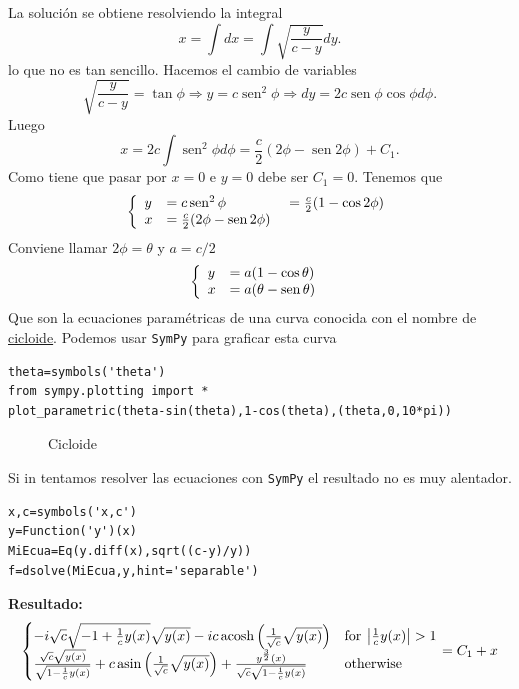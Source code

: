 \documentclass{article}
\DeclareMathOperator{\sen}{sen}
\begin{document}
La solución se obtiene resolviendo la integral
\[x=\int dx=\int \sqrt{\frac{y}{c-y}}dy.\]
lo que no es tan sencillo. Hacemos el cambio de variables
\[\sqrt{\frac{y}{c-y}}=\tan\phi\Longrightarrow y=c\sen^2\phi\Longrightarrow dy=2c\sen\phi\cos\phi d\phi.\]
Luego
\[x=2c\int\sen^2\phi d\phi=\frac{c}{2}\left(2\phi-\sen 2\phi\right)+C_1.\]
Como tiene que pasar por $x=0$ e $y=0$ debe ser $C_1=0$.  Tenemos que
 \[\left\{\begin{array}{l l l}
	      y&=c\sen^2 \phi&=\frac{c}{2}(1-\cos2\phi)\\
	      x&=\frac{c}{2}(2\phi-\sen2\phi)\ &\\
          \end{array}\right.
\]
Conviene llamar $2\phi=\theta$ y $a=c/2$
 \[\left\{\begin{array}{l l }
	      y&= a(1-\cos\theta)\\
	      x&=a(\theta-\sen\theta)\
          \end{array}\right.
\]
Que son la ecuaciones paramétricas de una curva conocida con el nombre de \href{http://es.wikipedia.org/wiki/Cicloide}{cicloide}. Podemos usar \texttt{SymPy} para graficar esta curva
\begin{lstlisting}
theta=symbols('theta')
from sympy.plotting import *
plot_parametric(theta-sin(theta),1-cos(theta),(theta,0,10*pi))
\end{lstlisting}



\begin{figure}[h]
\begin{center}
\end{center}\caption{Cicloide}\label{fig:cicloide}
\end{figure}


Si in tentamos resolver las ecuaciones con \texttt{SymPy} el resultado no es muy alentador.

\begin{lstlisting}
x,c=symbols('x,c')
y=Function('y')(x)
MiEcua=Eq(y.diff(x),sqrt((c-y)/y))
f=dsolve(MiEcua,y,hint='separable')
\end{lstlisting}
\textbf{Resultado:}
\[
 \begin{cases} - i \sqrt{c} \sqrt{-1 + \frac{1}{c} y{\left (x \right )}} \sqrt{y{\left (x \right )}} - i c \operatorname{acosh}{\left (\frac{1}{\sqrt{c}} \sqrt{y{\left (x \right )}} \right )} & \text{for}\: \left\lvert{\frac{1}{c} y{\left (x \right )}}\right\rvert > 1 \\ \- \frac{\sqrt{c} \sqrt{y{\left (x \right )}}}{\sqrt{1 - \frac{1}{c} y{\left (x \right )}}} + c \operatorname{asin}{\left (\frac{1}{\sqrt{c}} \sqrt{y{\left (x \right )}} \right )} + \frac{y^{\frac{3}{2}}{\left (x \right )}}{\sqrt{c} \sqrt{1 - \frac{1}{c} y{\left (x \right )}}} & \text{otherwise} \end{cases} = C_{1} + x
\]
\end{document}
